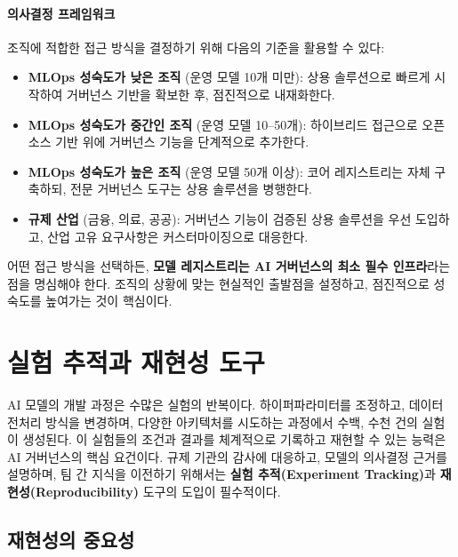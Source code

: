 \paragraph{의사결정 프레임워크}

조직에 적합한 접근 방식을 결정하기 위해 다음의 기준을 활용할 수 있다:

\begin{itemize}
  \item \textbf{MLOps 성숙도가 낮은 조직} (운영 모델 10개 미만): 상용 솔루션으로 빠르게 시작하여 거버넌스 기반을 확보한 후, 점진적으로 내재화한다.
  \item \textbf{MLOps 성숙도가 중간인 조직} (운영 모델 10--50개): 하이브리드 접근으로 오픈소스 기반 위에 거버넌스 기능을 단계적으로 추가한다.
  \item \textbf{MLOps 성숙도가 높은 조직} (운영 모델 50개 이상): 코어 레지스트리는 자체 구축하되, 전문 거버넌스 도구는 상용 솔루션을 병행한다.
  \item \textbf{규제 산업} (금융, 의료, 공공): 거버넌스 기능이 검증된 상용 솔루션을 우선 도입하고, 산업 고유 요구사항은 커스터마이징으로 대응한다.
\end{itemize}

어떤 접근 방식을 선택하든, \textbf{모델 레지스트리는 AI 거버넌스의 최소 필수 인프라}라는 점을 명심해야 한다. 조직의 상황에 맞는 현실적인 출발점을 설정하고, 점진적으로 성숙도를 높여가는 것이 핵심이다\cite{kreuzberger2023machine}.


\section{실험 추적과 재현성 도구}
\label{sec:14.2}

AI 모델의 개발 과정은 수많은 실험의 반복이다. 하이퍼파라미터를 조정하고, 데이터 전처리 방식을 변경하며, 다양한 아키텍처를 시도하는 과정에서 수백, 수천 건의 실험이 생성된다. 이 실험들의 조건과 결과를 체계적으로 기록하고 재현할 수 있는 능력은 AI 거버넌스의 핵심 요건이다. 규제 기관의 감사에 대응하고, 모델의 의사결정 근거를 설명하며, 팀 간 지식을 이전하기 위해서는 \textbf{실험 추적(Experiment Tracking)}과 \textbf{재현성(Reproducibility)} 도구의 도입이 필수적이다.

\subsection{재현성의 중요성}
\label{sec:14.2.1}

